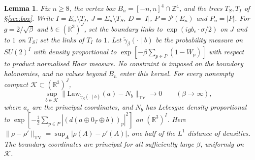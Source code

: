 \documentclass[11pt,a4paper]{article}
\theoremstyle{plain}
\newtheorem{lemma}[theorem]{Lemma}
\theoremstyle{definition}
\theoremstyle{remark}
\numberwithin{equation}{section}
\newcommand{\R}{\mathbb{R}}
\newcommand{\Z}{\mathbb{Z}}
\newcommand{\cP}{\mathcal{P}}
\begin{document}
\begin{lemma}\label{lem:S}
Fix $n\ge8$, the vertex box $B_n=[-n,n]^4\cap\Z^4$, and the trees $T_S,T_I$ of \S\ref{sec:box}.
Write $I=E_n\setminus T_I$, $J=\Sigma_n\setminus T_S$, $D=|I|$, $P=\cP(E_n)$ and $P_n=|P|$.
For $g=2/\sqrt\beta$ and $b\in(\R^3)^J$, set the boundary links to
$\exp(igb_e\cdot\sigma/2)$ on $J$ and to $1$ on $T_S$; set the links of $T_I$ to $1$.
Let $\tilde\gamma_\beta(\cdot\mid b)$ be the probability measure on $SU(2)^I$ with density proportional to
$\exp[-\beta\sum_{p\in P}(1-W_p)]$ with respect to product normalised Haar measure.
No constraint is imposed on the boundary holonomies, and no values beyond $B_n$ enter this kernel.
For every nonempty compact $\mathcal K\subset(\R^3)^J$,
\[
\sup_{b\in\mathcal K}
\bigl\|\mathrm{Law}_{\tilde\gamma_\beta(\cdot\mid b)}(a)-N_b\bigr\|_{\mathrm{TV}}
\longrightarrow0\qquad(\beta\to\infty),
\]
where $a_e$ are the principal coordinates, and $N_b$ has Lebesgue density proportional to
$\exp[-\frac12\sum_{p\in P}|(d(a\oplus0_T\oplus b))_p|^2]$ on $(\R^3)^I$.
Here $\|\rho-\rho'\|_{\mathrm{TV}}=\sup_A|\rho(A)-\rho'(A)|$, one half of the $L^1$ distance of densities.
The boundary coordinates are principal for all sufficiently large $\beta$, uniformly on $\mathcal K$.
\end{lemma}
\end{document}
